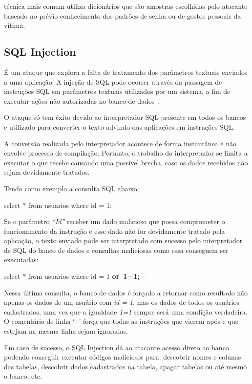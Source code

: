 \documentclass[
    12pt,               %
    openright,          %
    oneside,            %
    a4paper,            %
    section=TITLE,     %
    english,            %
    french,             %
    spanish,            %
    brazil              %
    ]{abntex2}
\newcommand{\citep}{\cite}
\begin{document}
técnica mais comum utiliza dicionários que são amostras escolhidas pelo atacante baseado no prévio conhecimento dos padrões de senha ou de gostos pessoais da vítima. \citep{62228}




\subsection{SQL Injection}

É um ataque que explora a falta de tratamento dos parâmetros textuais enviados a uma aplicação. A injeção de SQL pode ocorrer através da passagem de instruções SQL em parâmetros textuais utilizados por um sistema, a fim de executar ações não autorizadas no banco de dados~.



O ataque só tem êxito devido ao interpretador SQL presente em todos os bancos e utilizado para converter o texto advindo das aplicações em instruções SQL.


A conversão realizada pelo interpretador acontece de forma instantânea e não envolve processo de compilação. Portanto, o trabalho do interpretador se limita a executar o que recebe causando uma possível brecha, caso os dados recebidos não sejam devidamente tratados.


Tendo como exemplo a consulta SQL abaixo:


select * from usuarios where id = 1;


Se o parâmetro \emph{\textquotedblleft{}Id\textquotedblright{} }receber um dado malicioso que possa comprometer o funcionamento da instrução e esse dado não for devidamente tratado pela aplicação, o texto enviado pode ser interpretado com sucesso pelo interpretador de SQL do banco de dados e consultas maliciosas como essa conseguem ser executadas:


select * from usuarios where id = 1 \textbf{or~1=1; --}


Nessa última consulta, o banco de dados é forçado a retornar como resultado não apenas os dados de um usuário com \emph{id = 1}, mas os dados de todos os usuários cadastrados, uma vez que a igualdade \emph{1=1} sempre será uma condição verdadeira. O comentário de linha $\lq$--\rq{} força que todas as instruções que vierem após e que estejam na mesma linha sejam ignoradas.


Em caso de sucesso, o SQL Injection dá ao atacante acesso direto ao banco podendo conseguir executar códigos maliciosos para: descobrir nomes e colunas das tabelas, descobrir dados cadastrados na tabela, apagar tabelas ou até mesmo o banco, etc.
\end{document}
